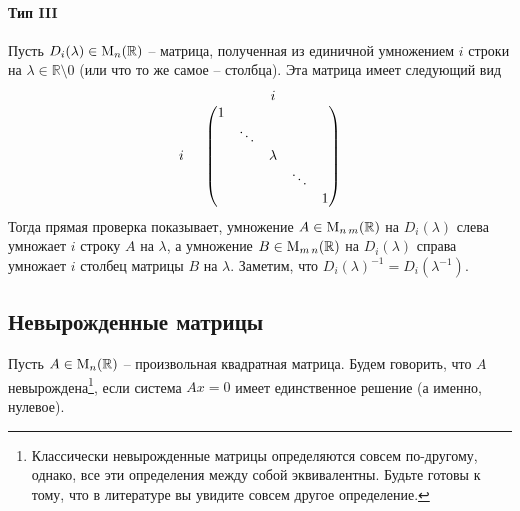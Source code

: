\paragraph{Тип III} Пусть $D_i(\lambda)\in\operatorname{M}_{n}(\mathbb R)$ -- матрица, полученная из единичной умножением $i$ строки на $\lambda\in\mathbb R\setminus 0$ (или что то же самое -- столбца). Эта матрица имеет следующий вид
\[
\begin{tabular}{cc}
{}&{$i$}\\
{
$
\begin{matrix}
{}\\{}\\{i}\\{}\\{}
\end{matrix}
$}&{
$
\begin{pmatrix}
{1}&{}&{}&{}&{}\\
{}&{\ddots}&{}&{}&{}\\
{}&{}&{\lambda}&{}&{}\\
{}&{}&{}&{\ddots}&{}\\
{}&{}&{}&{}&{1}\\
\end{pmatrix}
$
}
\end{tabular}
\]
Тогда прямая проверка показывает, умножение $A\in\operatorname{M}_{n\,m}(\mathbb R)$ на $D_i(\lambda)$ слева умножает $i$ строку $A$ на $\lambda$, а умножение $B\in\operatorname{M}_{m\,n}(\mathbb R)$ на $D_i(\lambda)$ справа умножает $i$ столбец матрицы $B$ на $\lambda$. Заметим, что $D_i(\lambda)^{-1}= D_i(\lambda^{-1})$.

\subsection{Невырожденные матрицы}


Пусть $A\in\operatorname{M}_{n}(\mathbb R)$ -- произвольная квадратная матрица. Будем говорить, что $A$ невырождена\footnote{Классически невырожденные матрицы определяются совсем по-другому, однако, все эти определения между собой эквивалентны. Будьте готовы к тому, что в литературе вы увидите совсем другое определение.}, если система $Ax = 0$ имеет единственное решение (а именно, нулевое). 

